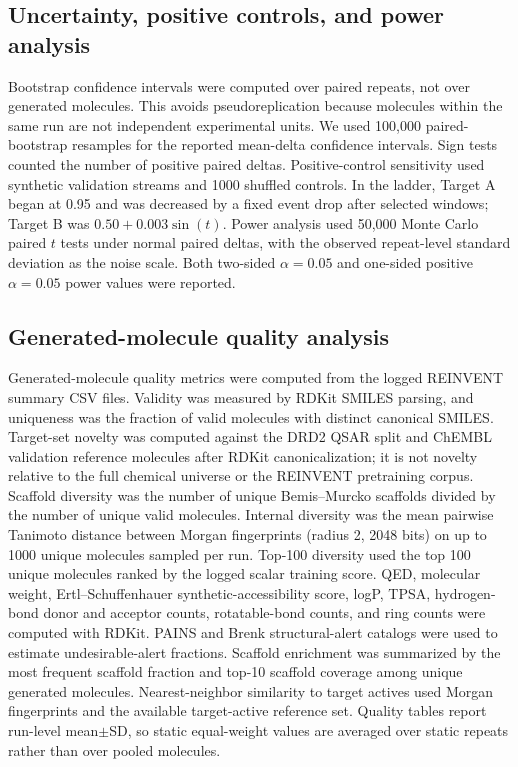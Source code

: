 \documentclass[referee,lineno,pdflatex,sn-basic]{sn-jnl}
\theoremstyle{thmstyleone}%
\theoremstyle{thmstyletwo}%
\theoremstyle{thmstylethree}%
\begin{document}
\subsection{Uncertainty, positive controls, and power analysis}\label{subsec:statistics}

Bootstrap confidence intervals were computed over paired repeats, not over generated molecules. This avoids pseudoreplication because molecules within the same run are not independent experimental units. We used 100,000 paired-bootstrap resamples for the reported mean-delta confidence intervals. Sign tests counted the number of positive paired deltas. Positive-control sensitivity used synthetic validation streams and 1000 shuffled controls. In the ladder, Target A began at 0.95 and was decreased by a fixed event drop after selected windows; Target B was $0.50+0.003\sin(t)$. Power analysis used 50,000 Monte Carlo paired $t$ tests under normal paired deltas, with the observed repeat-level standard deviation as the noise scale. Both two-sided $\alpha=0.05$ and one-sided positive $\alpha=0.05$ power values were reported.

\subsection{Generated-molecule quality analysis}\label{subsec:quality_methods}

Generated-molecule quality metrics were computed from the logged REINVENT summary CSV files. Validity was measured by RDKit SMILES parsing, and uniqueness was the fraction of valid molecules with distinct canonical SMILES. Target-set novelty was computed against the DRD2 QSAR split and ChEMBL validation reference molecules after RDKit canonicalization; it is not novelty relative to the full chemical universe or the REINVENT pretraining corpus. Scaffold diversity was the number of unique Bemis--Murcko scaffolds divided by the number of unique valid molecules. Internal diversity was the mean pairwise Tanimoto distance between Morgan fingerprints (radius 2, 2048 bits) on up to 1000 unique molecules sampled per run. Top-100 diversity used the top 100 unique molecules ranked by the logged scalar training score. QED, molecular weight, Ertl--Schuffenhauer synthetic-accessibility score, logP, TPSA, hydrogen-bond donor and acceptor counts, rotatable-bond counts, and ring counts were computed with RDKit. PAINS and Brenk structural-alert catalogs were used to estimate undesirable-alert fractions. Scaffold enrichment was summarized by the most frequent scaffold fraction and top-10 scaffold coverage among unique generated molecules. Nearest-neighbor similarity to target actives used Morgan fingerprints and the available target-active reference set. Quality tables report run-level mean$\pm$SD, so static equal-weight values are averaged over static repeats rather than over pooled molecules.
\end{document}
